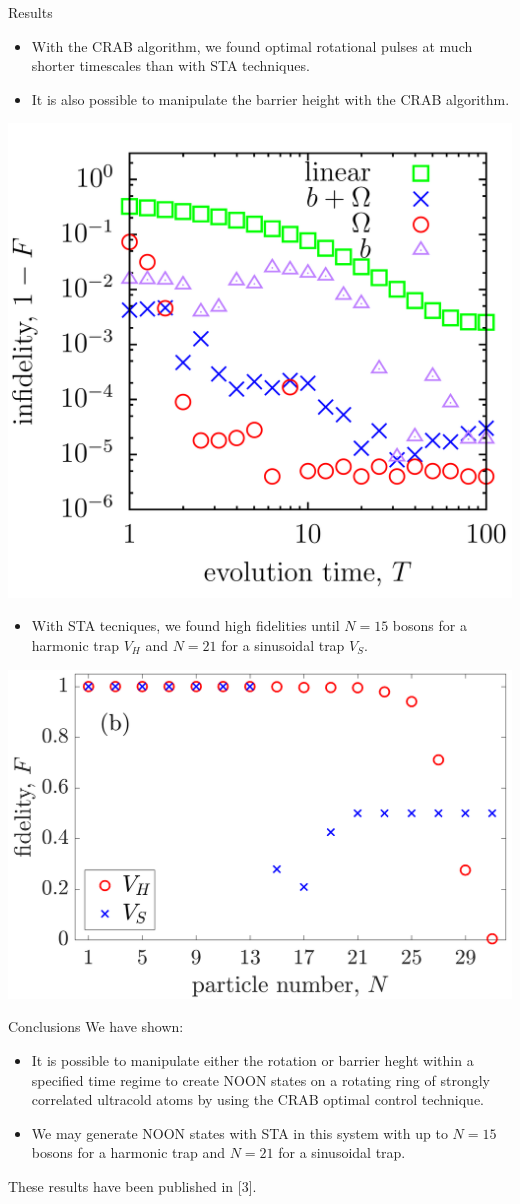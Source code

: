 \documentclass[final]{beamer}
\begin{document}
\begin{frame}
\begin{columns}[t]
\begin{column}{.49\textwidth}
\vfill

\begin{block}{Results}
  \begin{itemize}
    \item With the CRAB algorithm, we found optimal rotational pulses at much shorter timescales than with STA techniques.
    \item It is also possible to manipulate the barrier height with the CRAB algorithm.
  \end{itemize}
  \centering
  \includegraphics[width=0.5\linewidth]{final.png}
  \begin{itemize}
    \item With STA tecniques, we found high fidelities until $N = 15$ bosons for a harmonic trap $V_H$ and $N=21$ for a sinusoidal trap $V_S$.
  \end{itemize}
  \includegraphics[width=0.6\linewidth]{fig7b.png}
\end{block}

\vfill

\begin{block}{Conclusions}
  We have shown:
  \begin{itemize}
    \item It is possible to manipulate either the rotation or barrier heght within a specified time regime to create NOON states on a rotating ring of strongly correlated ultracold atoms by using the CRAB optimal control technique.
    \item We may generate NOON states with STA in this system with up to $N=15$ bosons for a harmonic trap and $N=21$ for a sinusoidal trap.
  \end{itemize}
  These results have been published in [3].


\end{block}
\end{column}
\end{columns}
\end{frame}
\end{document}
